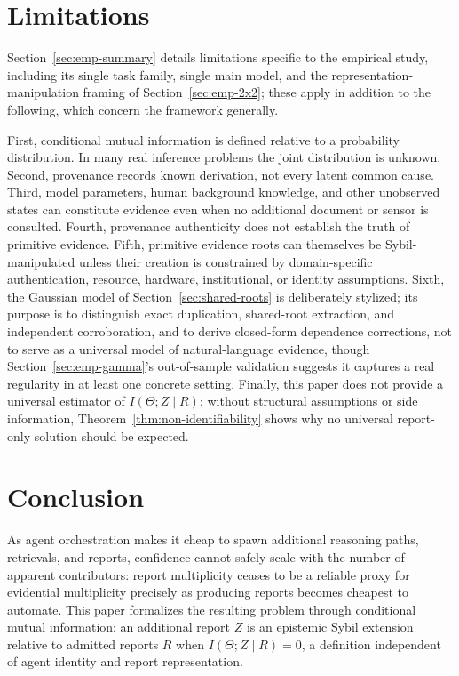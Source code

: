 \documentclass[11pt]{article}
\theoremstyle{definition}
\begin{document}
\section{Limitations}
\label{sec:limitations}

Section~\ref{sec:emp-summary} details limitations specific to the empirical study, including its single task family, single main model, and the representation-manipulation framing of Section~\ref{sec:emp-2x2}; these apply in addition to the following, which concern the framework generally.

First, conditional mutual information is defined relative to a probability distribution. In many real inference problems the joint distribution is unknown. Second, provenance records known derivation, not every latent common cause. Third, model parameters, human background knowledge, and other unobserved states can constitute evidence even when no additional document or sensor is consulted. Fourth, provenance authenticity does not establish the truth of primitive evidence. Fifth, primitive evidence roots can themselves be Sybil-manipulated unless their creation is constrained by domain-specific authentication, resource, hardware, institutional, or identity assumptions. Sixth, the Gaussian model of Section~\ref{sec:shared-roots} is deliberately stylized; its purpose is to distinguish exact duplication, shared-root extraction, and independent corroboration, and to derive closed-form dependence corrections, not to serve as a universal model of natural-language evidence, though Section~\ref{sec:emp-gamma}'s out-of-sample validation suggests it captures a real regularity in at least one concrete setting. Finally, this paper does not provide a universal estimator of $I(\Theta;Z\mid R)$: without structural assumptions or side information, Theorem~\ref{thm:non-identifiability} shows why no universal report-only solution should be expected.

\section{Conclusion}
\label{sec:conclusion}

As agent orchestration makes it cheap to spawn additional reasoning paths, retrievals, and reports, confidence cannot safely scale with the number of apparent contributors: report multiplicity ceases to be a reliable proxy for evidential multiplicity precisely as producing reports becomes cheapest to automate. This paper formalizes the resulting problem through conditional mutual information: an additional report $Z$ is an epistemic Sybil extension relative to admitted reports $R$ when $I(\Theta;Z\mid R)=0$, a definition independent of agent identity and report representation.
\end{document}
